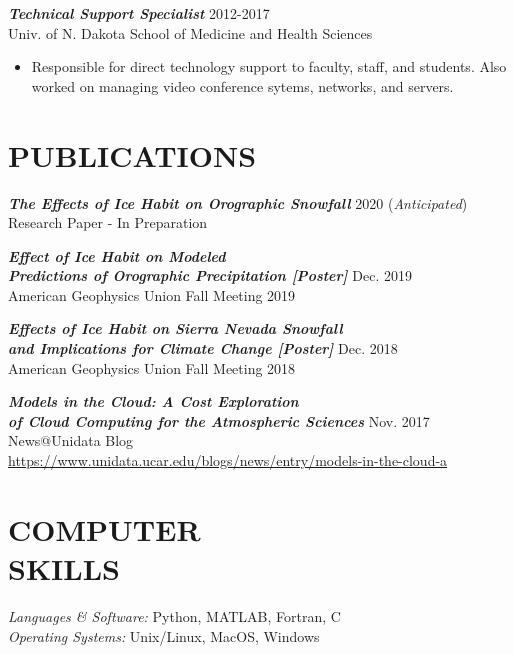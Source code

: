 \documentclass[margin]{res}
\begin{document}
\begin{resume}
\begin{itemize}
                \end{itemize}

                {\sl \textbf{Technical Support Specialist}} \hfill 2012-2017 \\
                Univ. of N. Dakota School of Medicine and Health Sciences \\
                \begin{itemize} \itemsep -2pt
                    \item Responsible  for  direct  technology  support  to  faculty,  staff,  and  students.  Also  worked  on managing video conference sytems, networks, and servers.

                \end{itemize}

\section{PUBLICATIONS}
                {\sl \textbf{The Effects of Ice Habit on Orographic Snowfall}} \hfill 2020 (\textit{Anticipated}) \\
                Research Paper - In Preparation 

                {\sl \textbf{Effect of Ice Habit on Modeled \\ Predictions of Orographic Precipitation [Poster]}} \hfill Dec. 2019 \\
                American Geophysics Union Fall Meeting 2019

                {\sl \textbf{Effects of Ice Habit on Sierra Nevada Snowfall \\ and Implications for Climate Change [Poster]}} \hfill Dec. 2018 \\
                American Geophysics Union Fall Meeting 2018

                {\sl \textbf{Models in the Cloud: A Cost Exploration \\ of Cloud Computing for the Atmospheric Sciences}} \hfill Nov. 2017 \\
                News@Unidata Blog \\
                \href{https://www.unidata.ucar.edu/blogs/news/entry/models-in-the-cloud-a}{https://www.unidata.ucar.edu/blogs/news/entry/models-in-the-cloud-a}

\section{COMPUTER \\ SKILLS} 
                {\sl Languages \& Software:} Python, MATLAB, Fortran, C \\
                {\sl Operating Systems:} Unix/Linux, MacOS, Windows


\end{resume}
\end{document}
